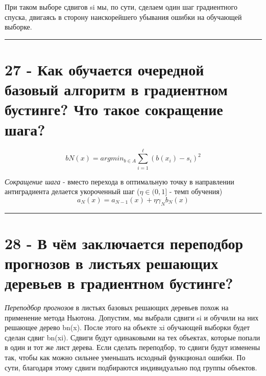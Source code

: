 \documentclass[11pt]{article}
\begin{document}
При таком выборе сдвигов si мы, по сути, сделаем один шаг градиентного
спуска, двигаясь в сторону наискорейшего убывания ошибки на обучающей
выборке.

    \begin{center}\rule{0.5\linewidth}{\linethickness}\end{center}

    \section{27 - Как обучается очередной базовый алгоритм в градиентном
бустинге? Что такое сокращение
шага?}\label{ux43aux430ux43a-ux43eux431ux443ux447ux430ux435ux442ux441ux44f-ux43eux447ux435ux440ux435ux434ux43dux43eux439-ux431ux430ux437ux43eux432ux44bux439-ux430ux43bux433ux43eux440ux438ux442ux43c-ux432-ux433ux440ux430ux434ux438ux435ux43dux442ux43dux43eux43c-ux431ux443ux441ux442ux438ux43dux433ux435-ux447ux442ux43e-ux442ux430ux43aux43eux435-ux441ux43eux43aux440ux430ux449ux435ux43dux438ux435-ux448ux430ux433ux430}

\[bN (x) = arg min_{b∈A}\sum_{i=1}^ℓ(b(x_i) − s_i)^2\]

\emph{Сокращение шага} - вместо перехода в оптимальную точку в
направлении антиградиента делается укороченный шаг (\(η∈(0,1]\) - темп
обучения) \[a_N(x) = a_{N−1}(x) + ηγ_N b_N (x)\]

    \begin{center}\rule{0.5\linewidth}{\linethickness}\end{center}

    \section{28 - В чём заключается переподбор прогнозов в листьях решающих
деревьев в градиентном
бустинге?}\label{ux432-ux447ux451ux43c-ux437ux430ux43aux43bux44eux447ux430ux435ux442ux441ux44f-ux43fux435ux440ux435ux43fux43eux434ux431ux43eux440-ux43fux440ux43eux433ux43dux43eux437ux43eux432-ux432-ux43bux438ux441ux442ux44cux44fux445-ux440ux435ux448ux430ux44eux449ux438ux445-ux434ux435ux440ux435ux432ux44cux435ux432-ux432-ux433ux440ux430ux434ux438ux435ux43dux442ux43dux43eux43c-ux431ux443ux441ux442ux438ux43dux433ux435}

\emph{Переподбор прогнозов} в листьях базовых решающих деревьев похож на
применение метода Ньютона. Допустим, мы выбрали сдвиги si и обучили на
них решающее дерево bn(x). После этого на объекте xi обучающей выборки
будет сделан сдвиг bn(xi). Сдвиги будут одинаковыми на тех объектах,
которые попали в один и тот же лист дерева. Если сделать переподбор, то
сдвиги будут изменены так, чтобы как можно сильнее уменьшать исходный
функционал ошибки. По сути, благодаря этому сдвиги подбираются
индивидуально под группы объектов.
\end{document}

